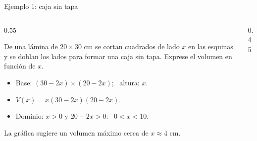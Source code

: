\documentclass[10pt,aspectratio=169]{beamer}
\begin{document}
\begin{frame}{Ejemplo 1: caja sin tapa}
  \begin{columns}
    \begin{column}{0.55\textwidth}
      \begin{ejemplo}
        De una lámina de $20\times30$ cm se cortan cuadrados de lado $x$ en las esquinas y se doblan los lados para formar una caja sin tapa.
        Exprese el volumen en función de $x$.
        \begin{itemize}
          \item Base: $(30-2x)\times(20-2x)$; \ altura: $x$.
          \item $V(x)=x(30-2x)(20-2x)$.
          \item Dominio: $x>0$ y $20-2x>0$: \ $0<x<10$.
        \end{itemize}
      \end{ejemplo}
      \small La gráfica sugiere un volumen máximo cerca de $x\approx4$ cm.
    \end{column}
    \begin{column}{0.45\textwidth}
      \centering
      \vspace{1mm}

    \end{column}
  \end{columns}
\end{frame}
\end{document}
